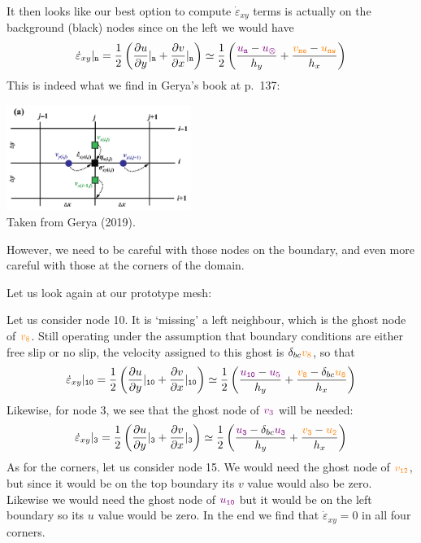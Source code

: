 It then looks like our best option to compute $\dot{\varepsilon}_{xy}$
terms is actually on the background (black) nodes since 
on the left we would have
\[
\dot{\varepsilon}_{xy}|_{\tt n} 
= 
\frac12 \left(  
\frac{\partial u}{\partial y}|_{\tt n}
+
\frac{\partial v}{\partial x}|_{\tt n}
\right)
\simeq 
\frac12 
\left( 
\frac{{\color{violet}u_{\tt n}} -{\color{violet}u_\otimes}}{h_y} + 
\frac{{\color{orange}v_{\tt ne}}-{\color{orange}u_{\tt nw}}}{h_x} 
\right)
\]
This is indeed what we find in Gerya's book at p.~137:
\begin{center}
\includegraphics[width=6cm]{images/fdm/gerya_H}\\
{\captionfont Taken from Gerya (2019).}
\end{center}
However, we need to be careful with those nodes on the boundary, and
even more careful with those at the corners of the domain. 

Let us look again at our prototype mesh:



Let us consider node 10. It is `missing' a left neighbour, which is 
the ghost node of ${\color{orange} v_{8}}$. 
Still operating under the assumption that boundary conditions are either 
free slip or no slip, the velocity assigned to this ghost is $\delta_{bc} {\color{orange} v_{8}}$,
so that 
\[
\dot{\varepsilon}_{xy}|_{\tt 10} 
= 
\frac12 \left(  
\frac{\partial u}{\partial y}|_{\tt 10}
+
\frac{\partial v}{\partial x}|_{\tt 10}
\right)
\simeq 
\frac12 
\left( 
\frac{{\color{violet}u_{\tt 10}} -{\color{violet}u_5}}{h_y} + 
\frac{{\color{orange}v_{\tt 8}}- \delta_{bc}{\color{orange}u_{\tt 8}}}{h_x} 
\right)
\]
Likewise, for node 3, we see that the ghost node of ${\color{violet} v_3}$
will be needed:
\[
\dot{\varepsilon}_{xy}|_{\tt 3} 
= 
\frac12 \left(  
\frac{\partial u}{\partial y}|_{\tt 3}
+
\frac{\partial v}{\partial x}|_{\tt 3}
\right)
\simeq 
\frac12 
\left( 
\frac{{\color{violet}u_{\tt 3}} -\delta_{bc} {\color{violet}u_{\tt 3}}}{h_y} + 
\frac{{\color{orange}v_{\tt 3}}- {\color{orange}u_{\tt 2}}}{h_x} 
\right)
\]
As for the corners, let us consider node 15. 
We would need the ghost node of ${\color{orange} v_{\tt 12}}$, but since 
it would be on the top boundary its $v$ value would also be zero. 
Likewise we would need the ghost node of ${\color{violet} u_{\tt 10}}$
but it would be on the left boundary so its $u$ value would be zero.
In the end we find that $\dot{\varepsilon}_{xy}=0$ in all four corners.






